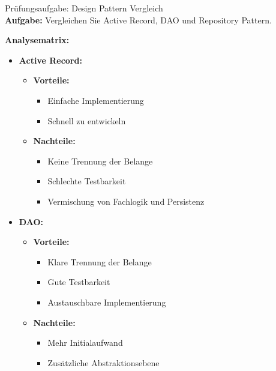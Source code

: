 \begin{example2}{Prüfungsaufgabe: Design Pattern Vergleich}\\
\textbf{Aufgabe:}
Vergleichen Sie Active Record, DAO und Repository Pattern.

\textbf{Analysematrix:}
\begin{itemize}
    \item \textbf{Active Record:}
    \begin{itemize}
        \item \textbf{Vorteile:}
        \begin{itemize}
            \item Einfache Implementierung
            \item Schnell zu entwickeln
        \end{itemize}
        \item \textbf{Nachteile:}
        \begin{itemize}
            \item Keine Trennung der Belange
            \item Schlechte Testbarkeit
            \item Vermischung von Fachlogik und Persistenz
        \end{itemize}
    \end{itemize}
    
    \item \textbf{DAO:}
    \begin{itemize}
        \item \textbf{Vorteile:}
        \begin{itemize}
            \item Klare Trennung der Belange
            \item Gute Testbarkeit
            \item Austauschbare Implementierung
        \end{itemize}
        \item \textbf{Nachteile:}
        \begin{itemize}
            \item Mehr Initialaufwand
            \item Zusätzliche Abstraktionsebene
        \end{itemize}
    \end{itemize}
    

\end{itemize}
\end{example2}

